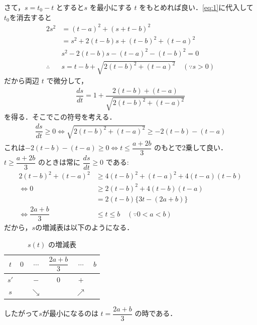 \documentclass[../../main.tex]{subfiles}
\begin{document}
さて，$s = t_0 - t$ とすると$s$ を最小にする $t$ をもとめれば良い．\cref{eq:1}に代入して$t_0$を消去すると
\begin{align}
  2 s^2
  &= (t-a)^2 + (s + t - b)^2 \\
  &= s^2 + 2(t-b)s + (t-b)^2 + (t-a)^2 \\
  & s^2 - 2(t-b)s - (t-a)^2 - (t-b)^2 = 0 \\
  \therefore
  & s = t-b + \sqrt{2(t-b)^2 + (t-a)^2} \quad (\because s > 0) \label{eq:2}
\end{align}
だから両辺 $t$ で微分して，
\begin{align}
  \dfrac{ds}{dt} = 1 + \dfrac{2(t-b) + (t-a)}{\sqrt{2(t-b)^2 + (t-a)^2}} \label{eq:3}
\end{align}
を得る．そこでこの符号を考える．
\begin{align}
  \dfrac{ds}{dt} \ge 0 \iff \sqrt{2(t-b)^2 + (t-a)^2} \ge -2(t-b) - (t-a)
\end{align}
これは$-2(t-b) - (t-a) \ge 0 \iff t \le \dfrac{a+2b}{3}$ のもとで2乗して良い．$t \ge \dfrac{a+2b}{3}$ のときは常に $\dfrac{ds}{dt} \ge 0$ である:
\begin{align}
  2(t-b)^2 + (t-a)^2 &\ge 4(t-b)^2 + (t-a)^2 + 4(t-a)(t-b) \\
  \iff
  0 &\ge 2(t-b)^2 + 4(t-b)(t-a) \\
  &= 2(t-b) \{ 3t - (2a+b) \} \\
  \iff
  \dfrac{2a+b}{3} &\le t \le b \quad (\because 0 < a < b)
\end{align}
だから，$s$の増減表は以下のようになる．

\begin{table}[htb]
  \centering
  \caption{$s(t)$ の増減表}
  \begin{tabular}{|c|c|c|c|c|c|}
    \hline
    $t$ & $0$ & $\cdots$ & $\dfrac{2a+b}{3}$ & $\cdots$ & $b$ \\
    \hline
    $s'$ & & $-$ & $0$ & $+$ & \\
    \hline
    $s$ & & $\searrow$ & & $\nearrow$ & \\
    \hline
  \end{tabular}
\end{table}

したがって$s$が最小になるのは $t = \dfrac{2a+b}{3}$ の時である．
\end{document}
